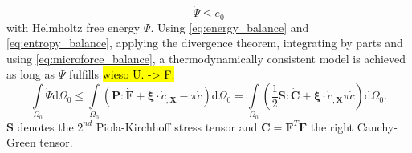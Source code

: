 \begin{equation} \label{eq:entropy_balance}
	\dot{\Psi}\leq\dot{e}_{0}
\end{equation}
with Helmholtz free energy $\Psi$. Using \eqref{eq:energy_balance} and \eqref{eq:entropy_balance}, applying the divergence theorem, integrating by parts and using \eqref{eq:microforce_balance}, a thermodynamically consistent model is achieved as long as $\Psi$ fulfills \hl{wieso U. -> F.}
\begin{equation} \label{eq:thermodyn_cons}
		\int\limits_{\Omega_{0}}\dot{\Psi}\mathrm{d}\Omega_{0} \leq \int\limits_{\Omega_{0}}\left(\mathbf{P}:\dot{\mathbf{F}}+\bm{\xi}\cdot\dot{c}_{,\mathbf{X}}-\pi\dot{c}\right)\mathrm{d}\Omega_{0} = \int\limits_{\Omega_{0}}\left(\dfrac{1}{2}\mathbf{S}:\dot{\mathbf{C}}+\bm{\xi}\cdot\dot{c}_{,\mathbf{X}}\pi\dot{c}\right)\mathrm{d}\Omega_{0}.
\end{equation}
$\mathbf{S}$ denotes the $2^{nd}$ Piola-Kirchhoff stress tensor and $\mathbf{C}=\mathbf{F}^{T}\mathbf{F}$ the right Cauchy-Green tensor.

